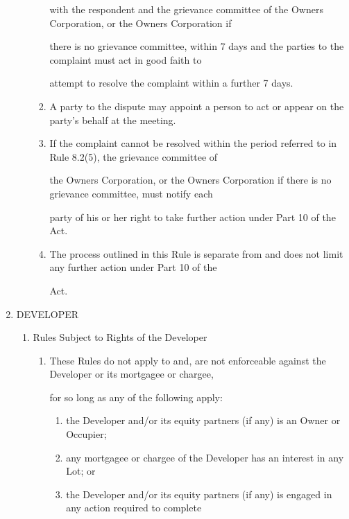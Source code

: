 \documentclass{article}
\begin{document}
\begin{enumerate}[label=\arabic*.]
\begin{enumerate}[label=\arabic{enumi}.\arabic*.]
\begin{enumerate}[label=(\arabic*)]
with the respondent and the grievance committee of the Owners Corporation, or the Owners Corporation if 

there is no grievance committee, within 7 days and the parties to the complaint must act in good faith to 

attempt to resolve the complaint within a further 7 days. 

\item  A party to the dispute may appoint a person to act or appear on the party’s behalf at the meeting. 

\item  If the complaint cannot be resolved within the period referred to in Rule 8.2(5), the grievance committee of 

the Owners Corporation, or the Owners Corporation if there is no grievance committee, must notify each 

party of his or her right to take further action under Part 10 of the Act. 

\item  The process outlined in this Rule is separate from and does not limit any further action under Part 10 of the 

Act. 

\end{enumerate}
\end{enumerate}
\item  DEVELOPER 

\begin{enumerate}[label=\arabic{enumi}.\arabic*.]
\item  Rules Subject to Rights of the Developer 

\begin{enumerate}[label=(\arabic*)]
\item  These Rules do not apply to and, are not enforceable against the Developer or its mortgagee or chargee, 

for so long as any of the following apply: 

\begin{enumerate}[label=(\alph*)]
\item  the Developer and/or its equity partners (if any) is an Owner or Occupier; 

\item  any mortgagee or chargee of the Developer has an interest in any Lot; or 

\item  the Developer and/or its equity partners (if any) is engaged in any action required to complete 


\end{enumerate}
\end{enumerate}
\end{enumerate}
\end{enumerate}
\end{document}
